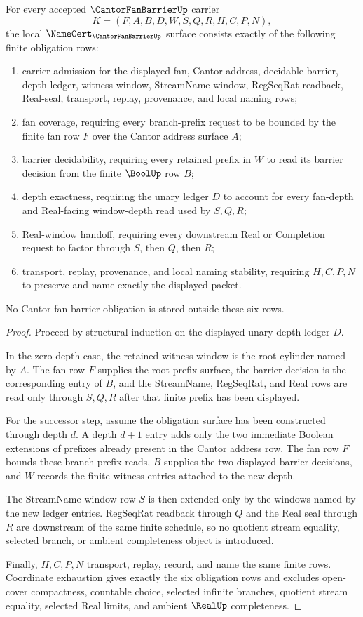 \begin{theorem}
\label{thm:cantor-fan-barrier-namecert-obligations}
For every accepted $\CantorFanBarrierUp$ carrier
$$
K=(F,A,B,D,W,S,Q,R,H,C,P,N),
$$
the local $\NameCert_{\CantorFanBarrierUp}$ surface consists exactly of the following finite obligation rows:
\begin{enumerate}
\item carrier admission for the displayed fan, Cantor-address, decidable-barrier, depth-ledger, witness-window, StreamName-window, RegSeqRat-readback, Real-seal, transport, replay, provenance, and local naming rows;
\item fan coverage, requiring every branch-prefix request to be bounded by the finite fan row $F$ over the Cantor address surface $A$;
\item barrier decidability, requiring every retained prefix in $W$ to read its barrier decision from the finite $\BoolUp$ row $B$;
\item depth exactness, requiring the unary ledger $D$ to account for every fan-depth and Real-facing window-depth read used by $S,Q,R$;
\item Real-window handoff, requiring every downstream Real or Completion request to factor through $S$, then $Q$, then $R$;
\item transport, replay, provenance, and local naming stability, requiring $H,C,P,N$ to preserve and name exactly the displayed packet.
\end{enumerate}
No Cantor fan barrier obligation is stored outside these six rows.
\end{theorem}
\begin{proof}
Proceed by structural induction on the displayed unary depth ledger $D$.

In the zero-depth case, the retained witness window is the root cylinder named by $A$. The fan row $F$ supplies the root-prefix surface, the barrier decision is the corresponding entry of $B$, and the StreamName, RegSeqRat, and Real rows are read only through $S,Q,R$ after that finite prefix has been displayed.

For the successor step, assume the obligation surface has been constructed through depth $d$. A depth $d+1$ entry adds only the two immediate Boolean extensions of prefixes already present in the Cantor address row. The fan row $F$ bounds these branch-prefix reads, $B$ supplies the two displayed barrier decisions, and $W$ records the finite witness entries attached to the new depth.

The StreamName window row $S$ is then extended only by the windows named by the new ledger entries. RegSeqRat readback through $Q$ and the Real seal through $R$ are downstream of the same finite schedule, so no quotient stream equality, selected branch, or ambient completeness object is introduced.

Finally, $H,C,P,N$ transport, replay, record, and name the same finite rows. Coordinate exhaustion gives exactly the six obligation rows and excludes open-cover compactness, countable choice, selected infinite branches, quotient stream equality, selected Real limits, and ambient $\RealUp$ completeness.
\end{proof}

